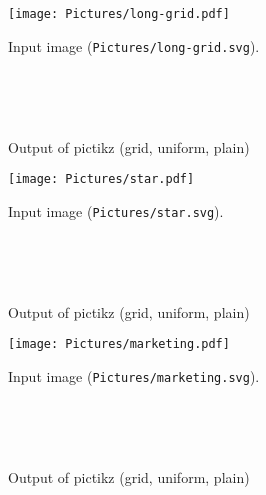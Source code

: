 \documentclass{article}
\begin{document}
\begin{figure}[H]
 \centering
 \texttt{[image: Pictures/long-grid.pdf]}
 \caption{Input image (\texttt{Pictures/long-grid.svg}).}
 \end{figure}

 \begin{figure}[H]
 \centering
 \begin{tikzpicture}[scale=1.5]
 
 \end{tikzpicture}~
 \begin{tikzpicture}[scale=1.5]
 
 \end{tikzpicture}~
 \begin{tikzpicture}[scale=1.5]
 
 \end{tikzpicture}
 \caption{Output of pictikz (grid, uniform, plain)}
 \end{figure}\clearpage

\begin{figure}[H]
 \centering
 \texttt{[image: Pictures/star.pdf]}
 \caption{Input image (\texttt{Pictures/star.svg}).}
 \end{figure}

 \begin{figure}[H]
 \centering
 \begin{tikzpicture}[scale=1.5]
 
 \end{tikzpicture}~
 \begin{tikzpicture}[scale=1.5]
 
 \end{tikzpicture}~
 \begin{tikzpicture}[scale=1.5]
 
 \end{tikzpicture}
 \caption{Output of pictikz (grid, uniform, plain)}
 \end{figure}\clearpage

\begin{figure}[H]
 \centering
 \texttt{[image: Pictures/marketing.pdf]}
 \caption{Input image (\texttt{Pictures/marketing.svg}).}
 \end{figure}

 \begin{figure}[H]
 \centering
 \begin{tikzpicture}[scale=1.5]
 
 \end{tikzpicture}~
 \begin{tikzpicture}[scale=1.5]
 
 \end{tikzpicture}~
 \begin{tikzpicture}[scale=1.5]
 
 \end{tikzpicture}
 \caption{Output of pictikz (grid, uniform, plain)}
 \end{figure}\clearpage
\end{document}
